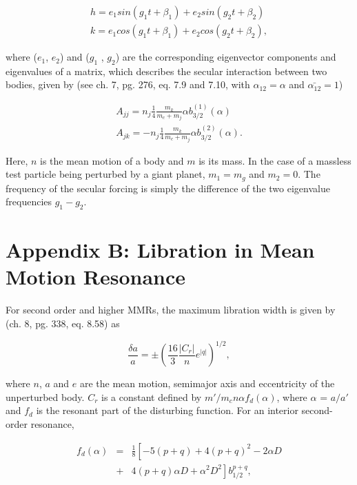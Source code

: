 \begin{eqnarray}\label{eq:kandh}
	h = e_{1} sin (g_{1} t + \beta_{1}) + e_{2} sin (g_{2} t + \beta_{2}) \\ \nonumber
	k = e_{1} cos (g_{1} t + \beta_{1}) + e_{2} cos (g_{2} t + \beta_{2}),
\end{eqnarray}

\noindent where  ($e_{1}$, $e_{2}$) and ($g_{1}$ , $g_{2}$) are the corresponding eigenvector components and eigenvalues of 
a matrix, which describes the secular interaction between two bodies, given by \cite{murray99} (see ch. 7, pg. 276, eq. 7.9 and 
7.10, with $\alpha_{12} = \alpha$ and $\bar{\alpha_{12}} = 1$)

\begin{eqnarray}\label{eq:pert_matrix}
	A_{jj} = n_{j} \frac{1}{4} \frac{m_{k}}{m_{c} + m_{j}} \alpha b_{3/2}^{(1)} (\alpha) \\ \nonumber
	A_{jk} = -n_{j} \frac{1}{4} \frac{m_{k}}{m_{c} + m_{j}} \alpha b_{3/2}^{(2)} (\alpha).
\end{eqnarray}

\noindent Here, $n$ is the mean motion of a body and $m$ is its mass. In the case of a massless test particle being perturbed by 
a giant planet, $m_{1} = m_{g}$ and $m_{2} = 0$. The frequency of the secular forcing is simply the difference of the two 
eigenvalue frequencies $g_{1} - g_{2}$.

\section{Appendix B: Libration in Mean Motion Resonance}\label{sec:libration}

For second order and higher MMRs, the maximum libration width is given by \cite{murray99} (ch. 8, pg. 338, eq. 8.58) as

\begin{equation}\label{eq:res_so}
	\frac{\delta a}{a} = \pm \left( \frac{16}{3} \frac{\left| C_{r} \right|}{n} e^{\left| q \right|} \right)^{1/2},
\end{equation}

\noindent where $n$, $a$ and $e$ are the mean motion, semimajor axis and eccentricity of the unperturbed body. $C_{r}$ is a 
constant defined by $m'/m_{c} n \alpha f_{d}(\alpha)$, where $\alpha$ = $a/a'$ and $f_{d}$ is the resonant part of the disturbing 
function. For an interior second-order resonance,

\begin{eqnarray}\label{eq:fd_so}
	f_{d} (\alpha) &=& \frac{1}{8} \left[ -5(p+q) + 4(p+q)^{2} - 2 \alpha D \right. \\ \nonumber
	                      & + & \left. 4(p+q) \alpha D + \alpha^{2} D^{2} \right] b^{p+q}_{1/2},
\end{eqnarray}

